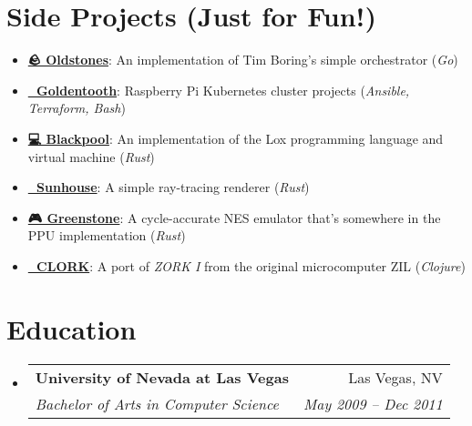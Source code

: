 \documentclass[letterpaper,11pt]{article}
\makeatletter
\newcommand{\resumeSubheading}[4]{
  \vspace{-2pt}\item
    \begin{tabular*}{0.97\textwidth}[t]{l@{\extracolsep{\fill}}r}
      \textbf{#1} & #2 \\
      \textit{\small#3} & \textit{\small #4} \\
    \end{tabular*}\vspace{-7pt}
}
\newcommand{\resumeSubHeadingListStart}{\begin{itemize}[leftmargin=0.15in, label={}]}
\newcommand{\resumeSubHeadingListEnd}{\end{itemize}}
\newenvironment{resumeListicle}{
    \small        %
    \setlength{\itemsep}{0pt}
    \setlength{\parskip}{0pt}
}{}
\newcommand{\resumeListicleStart}{\begin{resumeListicle}}
\newcommand{\resumeListicleEnd}{\end{resumeListicle}}
\newcommand{\resumeSideProjectListicleItem}[4]{%
  \item \textbf{\href{#1}{#2}}: #3 (\emph{#4})%
}
\makeatother
\begin{document}
\section{Side Projects (Just for Fun!)}
  \resumeSubHeadingListStart
    \resumeListicleStart
      \resumeSideProjectListicleItem{https://github.com/ndouglas/oldstones/}{🪨 Oldstones}{An implementation of Tim Boring's simple orchestrator}{Go} \\
      \resumeSideProjectListicleItem{https://github.com/goldentooth/}{🦷 Goldentooth}{Raspberry Pi Kubernetes cluster projects}{Ansible, Terraform, Bash} \\
      \resumeSideProjectListicleItem{https://github.com/ndouglas/blackpool/}{💻 Blackpool}{An implementation of the Lox programming language and virtual machine}{Rust} \\
      \resumeSideProjectListicleItem{https://github.com/ndouglas/sunhouse/}{🌈 Sunhouse}{A simple ray-tracing renderer}{Rust} \\
      \resumeSideProjectListicleItem{https://github.com/ndouglas/greenstone/}{🎮 Greenstone}{A cycle-accurate NES emulator that's somewhere in the PPU implementation}{Rust} \\
      \resumeSideProjectListicleItem{https://github.com/ndouglas/clork/}{📜 CLORK}{A port of \emph{ZORK I} from the original microcomputer ZIL}{Clojure} \\
    \resumeListicleEnd
  \resumeSubHeadingListEnd

\section{Education}
  \resumeSubHeadingListStart
    \resumeSubheading
      {University of Nevada at Las Vegas}{Las Vegas, NV}
      {Bachelor of Arts in Computer Science}{May 2009 – Dec 2011}
  \resumeSubHeadingListEnd

\end{document}
